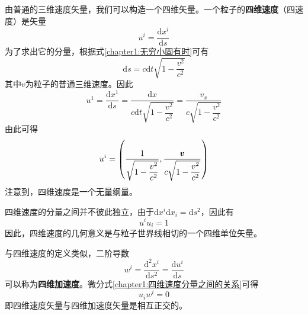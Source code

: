 由普通的三维速度矢量，我们可以构造一个四维矢量。一个粒子的{\bf 四维速度}（四速度）是矢量
\begin{equation}
	u^i = \frac{\mathrm{d} x^i}{\mathrm{d} s}
\end{equation}
为了求出它的分量，根据式\eqref{chapter1:无穷小固有时}可有
\begin{equation}
	\mathrm{d}s = c\mathrm{d}t\sqrt{1-\frac{v^2}{c^2}}
\end{equation}
其中$v$为粒子的普通三维速度。因此
\begin{equation*}
	u^1 = \frac{\mathrm{d}x^1}{\mathrm{d}s} = \frac{\mathrm{d}x}{c\mathrm{d}t\sqrt{1-\dfrac{v^2}{c^2}}} = \frac{v_x}{c \sqrt{1-\dfrac{v^2}{c^2}}}
\end{equation*}
由此可得
\begin{equation}
	u^i = \left(\frac{1}{\sqrt{1-\dfrac{v^2}{c^2}}},\frac{\boldsymbol{v}}{c\sqrt{1-\dfrac{v^2}{c^2}}}\right)
\end{equation}
注意到，四维速度是一个无量纲量。

四维速度的分量之间并不彼此独立，由于$\mathrm{d}x^i\mathrm{d}x_i = \mathrm{d}s^2$，因此有
\begin{equation}
	u^iu_i = 1
	\label{chapter1:四维速度分量之间的关系}
\end{equation}
因此，四维速度的几何意义是与粒子世界线相切的一个四维单位矢量。

与四维速度的定义类似，二阶导数
\begin{equation*}
	w^i = \frac{\mathrm{d}^2 x^i}{\mathrm{d} s^2} = \frac{\mathrm{d} u^i}{\mathrm{d} s}
\end{equation*}
可以称为{\bf 四维加速度}。微分式\eqref{chapter1:四维速度分量之间的关系}可得
\begin{equation}
	u_i w^i = 0
\end{equation}
即四维速度矢量与四维加速度矢量是相互正交的。



